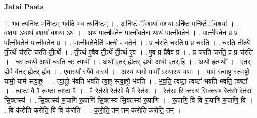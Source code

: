 \documentclass[17pt]{extarticle}
\begin{document}
\textbf{Jatai Paata} \newline

1. भव॒ त्यनि॑ष्ट॒ मनि॑ष्ट॒म् भव॑ति॒ भव॒ त्यनि॑ष्टम् । . अनि॑ष्टं ॅव॒शया॑ व॒शया ऽनि॑ष्ट॒ मनि॑ष्टं ॅव॒शया᳚ । . व॒शया ऽथाथ॑ व॒शया॑ व॒शया ऽथ॑ । . अथ॑ पात्नीव॒तेन॑ पात्नीव॒तेना थाथ॑ पात्नीव॒तेन॑ । . पा॒त्नी॒व॒तेन॒ प्र प्र पा᳚त्नीव॒तेन॑ पात्नीव॒तेन॒ प्र । . पा॒त्नी॒व॒तेनेति॑ पात्नी - व॒तेन॑ । . प्र च॑रति चरति॒ प्र प्र च॑रति । . च॒र॒ति॒ ती॒र्त्थे ती॒र्त्थे च॑रति चरति ती॒र्त्थे । . ती॒र्त्थ ए॒वैव ती॒र्त्थे ती॒र्त्थ ए॒व । . ए॒व प्र प्रैवैव प्र । . प्र च॑रति चरति॒ प्र प्र च॑रति । . च॒र॒ त्यथो॒ अथो॑ चरति चर॒ त्यथो᳚ । . अथो॑ ए॒तर् ह्ये॒तर् ह्यथो॒ अथो॑ ए॒तर्.हि॑ । . अथो॒ इत्यथो᳚ । . ए॒तर् ह्ये॒वै वैतर् ह्ये॒तर् ह्ये॒व । . ए॒वास्या᳚ स्यै॒वै वास्य॑ । . अ॒स्य॒ यामो॒ यामो᳚ ऽस्यास्य॒ यामः॑ । . याम॑ स्त्वा॒ष्ट्र स्त्वा॒ष्ट्रो यामो॒ याम॑ स्त्वा॒ष्ट्रः । . त्वा॒ष्ट्रो भ॑वति भवति त्वा॒ष्ट्र स्त्वा॒ष्ट्रो भ॑वति । . भ॒व॒ति॒ त्वष्टा॒ त्वष्टा॑ भवति भवति॒ त्वष्टा᳚ । . त्वष्टा॒ वै वै त्वष्टा॒ त्वष्टा॒ वै । . वै रेत॑सो॒ रेत॑सो॒ वै वै रेत॑सः । . रेत॑सः सि॒क्तस्य॑ सि॒क्तस्य॒ रेत॑सो॒ रेत॑सः सि॒क्तस्य॑ । . सि॒क्तस्य॑ रू॒पाणि॑ रू॒पाणि॑ सि॒क्तस्य॑ सि॒क्तस्य॑ रू॒पाणि॑ । . रू॒पाणि॒ वि वि रू॒पाणि॑ रू॒पाणि॒ वि । . वि क॑रोति करोति॒ वि वि क॑रोति । . क॒रो॒ति॒ तम् तम् क॑रोति करोति॒ तम् । \newline
\end{document}

